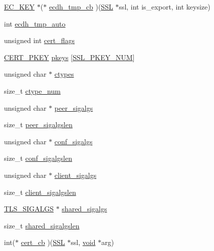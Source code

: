 \begin{DoxyCompactItemize}
\hyperlink{crypto_2ec_2ec_8h_a756878ae60b2fc17d4217e77ffe5e0d3}{E\+C\+\_\+\+K\+EY} $\ast$($\ast$ \hyperlink{structcert__st_afe34942adba04c0132ab8227b87708b4}{ecdh\+\_\+tmp\+\_\+cb} )(\hyperlink{crypto_2ossl__typ_8h_a71f21e09bf365489dab9d85bd4785e24}{S\+SL} $\ast$ssl, int is\+\_\+export, int keysize)
\item 
int \hyperlink{structcert__st_a03def639d744b387b29a3b62911e6eb4}{ecdh\+\_\+tmp\+\_\+auto}
\item 
unsigned int \hyperlink{structcert__st_a09d39f5a90b93e151545c3615c41e2b7}{cert\+\_\+flags}
\item 
\hyperlink{ssl__locl_8h_ab376b10820d145fbabe4f4fdf0b3a770}{C\+E\+R\+T\+\_\+\+P\+K\+EY} \hyperlink{structcert__st_aa3e7014f38763863265f61aac0a607e4}{pkeys} \mbox{[}\hyperlink{ssl__locl_8h_ae56b6c56e5819da2bf95a533238f69f8}{S\+S\+L\+\_\+\+P\+K\+E\+Y\+\_\+\+N\+UM}\mbox{]}
\item 
unsigned char $\ast$ \hyperlink{structcert__st_af28330052a1b8771bd6ef6a04ebab278}{ctypes}
\item 
size\+\_\+t \hyperlink{structcert__st_a897c085994e528f991829c3f2ac83202}{ctype\+\_\+num}
\item 
unsigned char $\ast$ \hyperlink{structcert__st_a86160776fd90a85e91a135bd433e4f98}{peer\+\_\+sigalgs}
\item 
size\+\_\+t \hyperlink{structcert__st_a4e99a4ef3e1cdc12cc5d82e8f4db626f}{peer\+\_\+sigalgslen}
\item 
unsigned char $\ast$ \hyperlink{structcert__st_a9b6a9a428e091e4ddc051d52453247b8}{conf\+\_\+sigalgs}
\item 
size\+\_\+t \hyperlink{structcert__st_ae3e5c76ca8b2a856893b354356867d31}{conf\+\_\+sigalgslen}
\item 
unsigned char $\ast$ \hyperlink{structcert__st_af7b4112ba1302e7f12f13ccde06fb678}{client\+\_\+sigalgs}
\item 
size\+\_\+t \hyperlink{structcert__st_ab636dae61f9c60d07f1549db251772fa}{client\+\_\+sigalgslen}
\item 
\hyperlink{include_2openssl_2ssl_8h_ad900ee6ad49f7ba5e415c85e98eea58f}{T\+L\+S\+\_\+\+S\+I\+G\+A\+L\+GS} $\ast$ \hyperlink{structcert__st_a1c623525317c82972b5a5211a356214a}{shared\+\_\+sigalgs}
\item 
size\+\_\+t \hyperlink{structcert__st_a59e2ecc2312469cab69d97afb231edad}{shared\+\_\+sigalgslen}
\item 
int($\ast$ \hyperlink{structcert__st_abd53d838428f924fed3b9f1fb54a7ff1}{cert\+\_\+cb} )(\hyperlink{crypto_2ossl__typ_8h_a71f21e09bf365489dab9d85bd4785e24}{S\+SL} $\ast$ssl, \hyperlink{hw__4758__cca_8h_afad4d591c7931ff6dc5bf69c76c96aa0}{void} $\ast$arg)

\end{DoxyCompactItemize}
